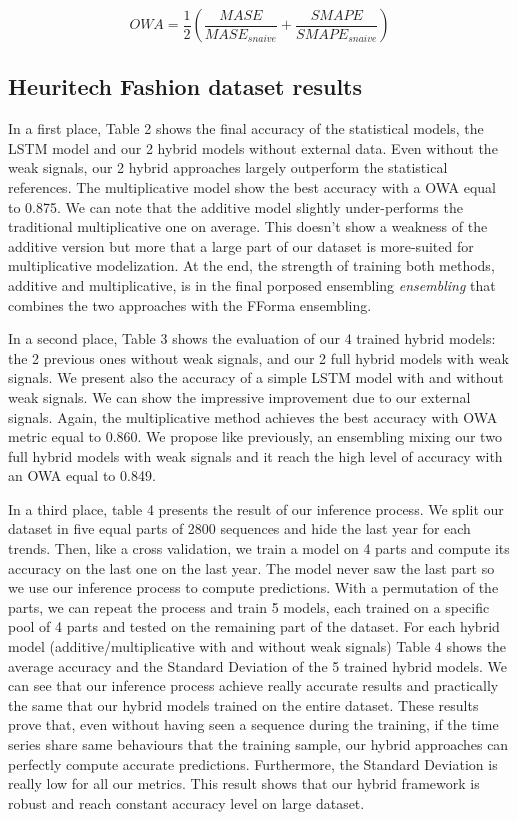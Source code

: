 \documentclass[letterpaper]{article} %
\begin{document}
$$
OWA = \frac{1}{2}(\frac{MASE}{MASE_{snaive}} + \frac{SMAPE}{SMAPE_{snaive}})
$$

\subsection{Heuritech Fashion dataset results}

In a first place, Table 2 shows the final accuracy of the statistical models, the LSTM model and our 2 hybrid models without external data. Even without the weak signals, our 2 hybrid approaches largely outperform the statistical references. The multiplicative model show the best accuracy with a OWA equal to 0.875. We can note that the additive model slightly under-performs the traditional multiplicative one on average. This doesn't show a weakness of the additive version but more that a large part of our dataset is more-suited for multiplicative modelization. At the end, the strength of training both methods, additive and multiplicative, is in the final porposed ensembling \textit{ensembling} that combines the two approaches with the FForma ensembling.

In a second place, Table 3 shows the evaluation of our 4 trained hybrid models: the 2 previous ones without weak signals, and our 2 full hybrid models with weak signals. We present also the accuracy of a simple LSTM model with and without weak signals. We can show the impressive improvement due to our external signals. Again, the multiplicative method achieves the best accuracy with OWA metric equal to 0.860. We propose like previously, an ensembling mixing our two full hybrid models with weak signals and it reach the high level of accuracy with an OWA equal to 0.849.

In a third place, table 4 presents the result of our inference process. We split our dataset in five equal parts of 2800 sequences and hide the last year for each trends. Then, like a cross validation, we train a model on 4 parts and compute its accuracy on the last one on the last year. The model never saw the last part so we use our inference process to compute predictions. With a permutation of the parts, we can repeat the process and train 5 models, each trained on a specific pool of 4 parts and tested on the remaining part of the dataset. For each hybrid model (additive/multiplicative with and without weak signals) Table 4 shows the average accuracy and the Standard Deviation of the 5 trained hybrid models. We can see that our inference process achieve really accurate results and practically the same that our hybrid models trained on the entire dataset. These results prove that, even without having seen a sequence during the training, if the time series share same behaviours that the training sample, our hybrid approaches can perfectly compute accurate predictions. Furthermore, the Standard Deviation is really low for all our metrics. This result shows that our hybrid framework is robust and reach constant accuracy level on large dataset.
\end{document}
